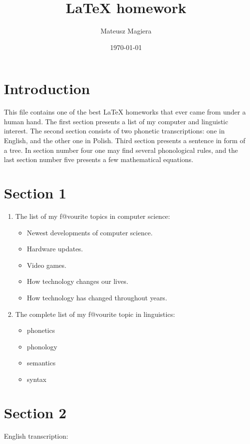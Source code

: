 \documentclass{article}
\title{\LaTeX{} homework}
\author{Mateusz Magiera }
\date{\today}
\begin{document}
\maketitle

\section{Introduction}
This file contains one of the best LaTeX homeworks that ever came from under a human hand. The first section presents a list of my computer and linguistic interest. The second section consists of two phonetic  transcriptions: one in English, and the other one in Polish. Third section presents a sentence in form of a tree. In section number four one may find several phonological rules, and the last section number five presents a few mathematical equations.
\section{Section 1}
\begin{enumerate}
   \item The list of my f@vourite topics in computer science:
   \begin{itemize}
     \item Newest developments of computer science.
     \item Hardware updates.
     \item Video games.
     \item How technology changes our lives.
     \item How technology has changed throughout years.
   \end{itemize}
   \item The complete list of my f@vourite topic in linguistics:
   \begin{itemize}
       \item phonetics
       \item phonology
       \item semantics
       \item syntax
   \end{itemize}
\end{enumerate}

\newpage \section{Section 2}
 English transcription:\newline
{}
\end{document}

